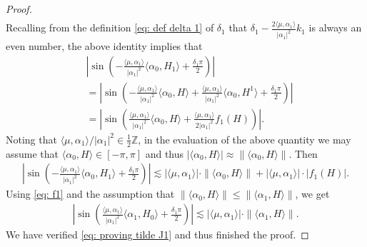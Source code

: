 \documentclass{amsart}
\numberwithin{equation}{section}
\numberwithin{equation}{section}
\begin{document}
\begin{proof}
\begin{align*}
\end{align*}
Recalling from the definition \eqref{eq: def delta 1} of ${\delta_1}$ that ${\delta_1}- \frac{2\langle\mu,\alpha_1\rangle }{|\alpha_1|^2}k_1$ is always an even number, the above identity implies that 
\begin{align*}
    &\left|\sin\left(-\frac{\langle\mu,\alpha_1\rangle}{|\alpha_1|^2}\langle \alpha_0, H_{1}\rangle+\frac{{\delta_1}\pi}{2}\right)\right|\\
    &=\left|\sin\left(-\frac{\langle\mu,\alpha_1\rangle}{|\alpha_1|^2}\langle \alpha_0, H\rangle+  \frac{\langle\mu,\alpha_1\rangle}{|\alpha_1|^2}\langle \alpha_0, H^{1}\rangle +\frac{{\delta_1} \pi}{2}\right)\right|\\
    &=\left|\sin\left(\frac{\langle\mu,\alpha_1\rangle}{|\alpha_1|^2}\langle \alpha_0, H\rangle+ \frac{\langle\mu,\alpha_1\rangle}{2|\alpha_1|^2}f_1(H)\right)\right|.
\end{align*}
Noting that $\langle\mu,\alpha_1\rangle/|\alpha_1|^2\in \frac12\mathbb{Z}$, in the evaluation of the above quantity we may assume that 
$\langle \alpha_0, H\rangle\in[-\pi,\pi]$ and thus $|\langle \alpha_0, H\rangle|\approx \|\langle \alpha_0, H\rangle\|$. 
Then 
\begin{align*}
    \left|\sin\left(-\frac{\langle\mu,\alpha_1\rangle}{|\alpha_1|^2}\langle \alpha_0, H_{1}\rangle+\frac{{\delta_1} \pi}{2}\right)\right|
    \lesssim 
|\langle\mu,\alpha_1\rangle|\cdot \|\langle\alpha_0, H\rangle\|+ |\langle\mu,\alpha_1\rangle|\cdot |f_1(H)|.
\end{align*}
Using \eqref{eq: f1} and the assumption that 
$\|\langle\alpha_0,H\rangle\|\leq\|\langle\alpha_1,H\rangle\|$,
we get 
\begin{align*}
    \left|\sin\left(\frac{\langle\mu,\alpha_1\rangle}{|\alpha_1|^2}\langle \alpha_1, H_{0}\rangle+\frac{{\delta_1} \pi}{2}\right)\right|
    \lesssim |\langle\mu,\alpha_1\rangle |\cdot \|\langle\alpha_1,H\rangle\|.
\end{align*}
We have verified \eqref{eq: proving tilde J1} and thus finished the proof.     
\end{proof}
\end{document}
